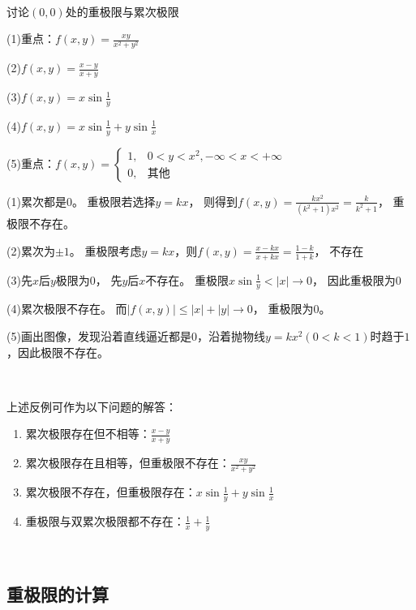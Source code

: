 ~

\begin{exercise}[常用反例]
  讨论$(0,0)$处的重极限与累次极限

  (1)重点：$f(x,y) = \frac{xy}{x^2 + y^2}$

  (2)$f(x,y) = \frac{x-y}{x+y}$

  (3)$f(x,y) = x \sin \frac{1}{y}$

  (4)$f(x,y) = x \sin \frac{1}{y} + y \sin \frac{1}{x}$

  (5)重点：$f(x,y) =
  \begin{cases}
    1, &0 < y<x^2 , -\infty < x <+\infty\\
    0, &\text{其他}
  \end{cases}
  $
\end{exercise}


\begin{solution}
  (1)累次都是$0$。
  重极限若选择$y = kx$，
  则得到$f(x,y) = \frac{kx^2}{(k^2 + 1)x^2} = \frac{k}{k^2 + 1}$，
  重极限不存在。

  (2)累次为$\pm 1$。
  重极限考虑$y = kx$，则$f(x,y) = \frac{x - kx}{x + kx} = \frac{1 - k}{1 + k}$，
  不存在

  (3)先$x$后$y$极限为$0$，
  先$y$后$x$不存在。
  重极限$x \sin \frac{1}{y} < |x| \rightarrow 0$，
  因此重极限为$0$

  (4)累次极限不存在。
  而$|f(x,y)| \leq |x| + |y| \rightarrow 0$，
  重极限为$0$。

  (5)画出图像，发现沿着直线逼近都是$0$，沿着抛物线$y = kx^2(0 < k < 1)$时趋于$1$，因此极限不存在。
\end{solution}


~

\begin{exercise}[反例应用]
  上述反例可作为以下问题的解答：
  \begin{enumerate}
  \item 累次极限存在但不相等：$\frac{x-y}{x+y}$
  \item 累次极限存在且相等，但重极限不存在：$\frac{xy}{x^2 + y^2}$
  \item 累次极限不存在，但重极限存在：$x \sin \frac{1}{y} + y \sin \frac{1}{x}$
  \item 重极限与双累次极限都不存在：$\frac{1}{x} + \frac{1}{y}$
  \end{enumerate}
\end{exercise}

~


\subsection{重极限的计算}




